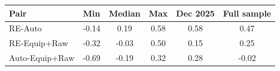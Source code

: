 \begin{tabular}{lccccc}
\toprule
\textbf{Pair} & Min & Median & Max & Dec 2025 & Full sample \\
\midrule
RE-Auto & -0.14 & 0.19 & 0.58 & 0.58 & 0.47 \\
RE-Equip+Raw & -0.32 & -0.03 & 0.50 & 0.15 & 0.25 \\
Auto-Equip+Raw & -0.69 & -0.19 & 0.32 & 0.28 & -0.02 \\
\bottomrule
\end{tabular}

